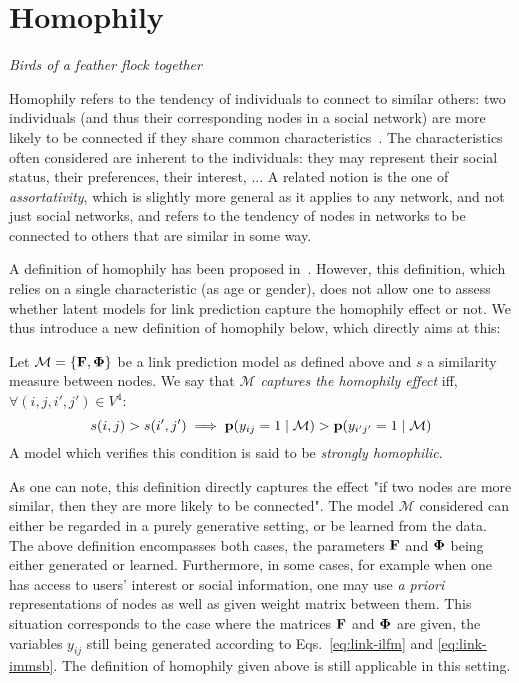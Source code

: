 \section{Homophily}
\label{sec:homophily}
\vspace{-0.2cm}
\begin{center} \emph{Birds of a feather flock together} \end{center}

\vspace{0.1cm}

Homophily refers to the tendency of individuals to connect to similar others: two individuals (and thus their corresponding nodes in a social network) are more likely to be connected if they share common characteristics~\cite{mcpherson2001birds,lazarsfeld1954friendship}. The characteristics often considered are inherent to the individuals: they may represent their social status, their preferences, their interest, ... A related notion is the one of {\it assortativity}, which is slightly more general as it applies to any network, and not just social networks, and refers to the tendency of nodes in networks to be connected to others that are similar in some way.

A definition of homophily has been proposed in~\cite{la2010randomization}. However, this definition, which relies on a single characteristic (as age or gender), does not allow one to assess whether latent models for link prediction capture the homophily effect or not. We thus introduce a new definition of homophily below, which directly aims at this:
%
\begin{definition}[Homophily]
	Let $\mathcal{M}=\{\mathbf{F},\mathbf{\Phi}\}$ be a link prediction model as defined above and $s$ a similarity measure between nodes. We say that \emph{$\mathcal{M}$ captures the homophily effect} iff, $\forall (i,j,i',j') \in V^4$:
%
\begin{equation}
s(i,j) > s(i',j')  \implies \mathbf{p}(y_{ij}=1 \mid \mathcal{M}) > \mathbf{p}(y_{i'j'}=1  \mid \mathcal{M}) \nonumber
\end{equation}
%
A model which verifies this condition is said to be \emph{strongly homophilic}.
\end{definition}
%
As one can note, this definition directly captures the effect "if two nodes are more similar, then they are more likely to be connected". The model $\mathcal{M}$ considered can either be regarded in a purely generative setting, or be learned from the data. The above definition encompasses both cases, the parameters $\mathbf{F}$ and $\mathbf{\Phi}$ being either generated or learned. Furthermore, in some cases, for example when one has access to users' interest or social information, one may use \textit{a priori} representations of nodes as well as given weight matrix between them. This situation corresponds to the case where the matrices $\mathbf{F}$ and $\mathbf{\Phi}$ are given, the variables $y_{ij}$ still being generated according to Eqs.~\ref{eq:link-ilfm} and \ref{eq:link-immsb}. The definition of homophily given above is still applicable in this setting.

